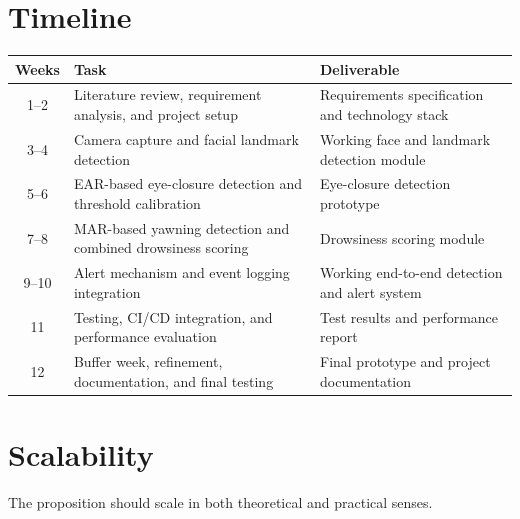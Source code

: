 \documentclass[11pt,a4paper]{article}
\begin{document}
\section{Timeline}

\begin{center}
\renewcommand{\arraystretch}{1.3}
\begin{tabular}{|c|p{6cm}|p{5cm}|}
\hline
\textbf{Weeks} & \textbf{Task} & \textbf{Deliverable} \\
\hline

1--2 &
Literature review, requirement analysis, and project setup &
Requirements specification and technology stack \\
\hline

3--4 &
Camera capture and facial landmark detection &
Working face and landmark detection module \\
\hline

5--6 &
EAR-based eye-closure detection and threshold calibration &
Eye-closure detection prototype \\
\hline

7--8 &
MAR-based yawning detection and combined drowsiness scoring &
Drowsiness scoring module \\
\hline

9--10 &
Alert mechanism and event logging integration &
Working end-to-end detection and alert system \\
\hline

11 &
Testing, CI/CD integration, and performance evaluation &
Test results and performance report \\
\hline

12 &
Buffer week, refinement, documentation, and final testing &
Final prototype and project documentation \\
\hline

\end{tabular}
\end{center}

\section{Scalability}
The proposition should scale in both theoretical and
practical senses.
\end{document}
